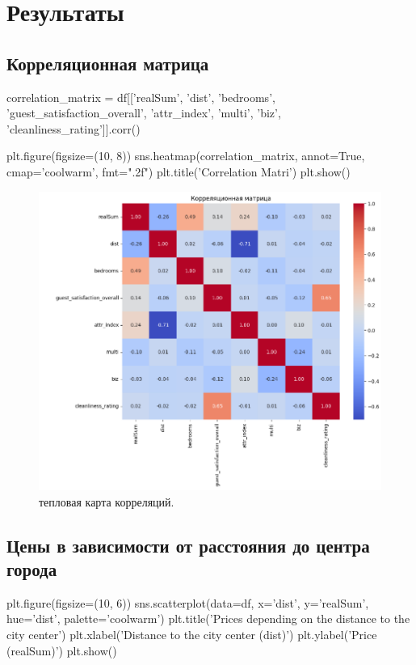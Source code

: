 \documentclass[
	11pt
] {article}
\begin{document}
\section{Результаты}

\subsection{Корреляционная матрица}
\begin{python}
correlation_matrix = df[['realSum', 'dist', 'bedrooms', 'guest_satisfaction_overall', 'attr_index', 'multi', 'biz', 'cleanliness_rating']].corr()

plt.figure(figsize=(10, 8))
sns.heatmap(correlation_matrix, annot=True, cmap='coolwarm', fmt=".2f")
plt.title('Correlation Matri')
plt.show()
\end{python}

	\begin{figure}[H]
		\centering
		\includegraphics[width=1.0\textwidth]{fig-01}
		\caption{тепловая карта корреляций.}
	\end{figure}

\subsection{Цены в зависимости от расстояния до центра города}
\begin{python}
plt.figure(figsize=(10, 6))
sns.scatterplot(data=df, x='dist', y='realSum', hue='dist', palette='coolwarm')
plt.title('Prices depending on the distance to the city center')
plt.xlabel('Distance to the city center (dist)')
plt.ylabel('Price (realSum)')
plt.show()
\end{python}
\end{document}
